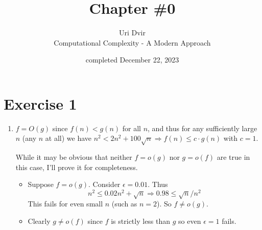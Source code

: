 \documentclass[12pt]{article}
\title{Chapter \#0}
\author{Uri Dvir \\ Computational Complexity - A Modern Approach}
\date{completed December 22, 2023}
\begin{document}
\maketitle

\section*{Exercise 1}

\begin{enumerate}
\item{
$f = O(g)$ since $f(n) < g(n)$ for all $n$, and thus for any sufficiently large $n$ (any $n$ at all) we have $n^2 < 2n^2 + 100\sqrt{n} \Rightarrow f(n) \leq c \cdot g(n)$ with $c = 1$.

\noindent
While it may be obvious that neither $f = o(g)$ nor $g = o(f)$ are true in this case, I'll prove it for completeness.
\begin{itemize}
\item{Suppose $f = o(g)$. Consider $\epsilon = 0.01$. Thus
$$
n^2 \leq 0.02n^2 + \sqrt{n} \Rightarrow 0.98 \leq \sqrt{n}/n^2
$$
This fails for even small $n$ (such as $n=2$). So $f \neq o(g)$.}
\item{Clearly $g \neq o(f)$ since $f$ is strictly less than $g$ so even $\epsilon = 1$ fails.}
\end{itemize}
}
\end{enumerate}
\end{document}
